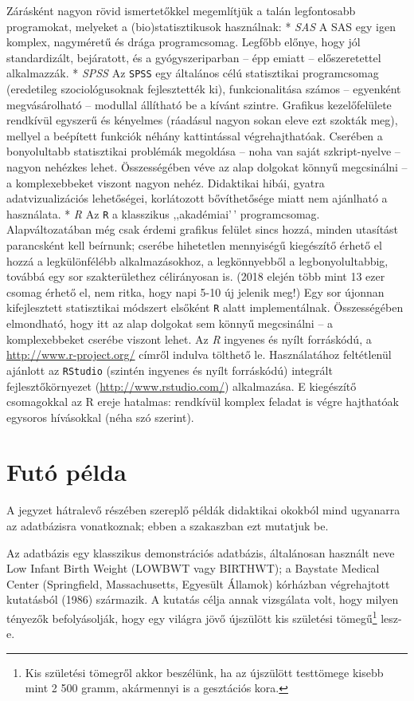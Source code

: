 \documentclass[
]{book}
\begin{document}
Zárásként nagyon rövid ismertetőkkel megemlítjük a talán legfontosabb programokat, melyeket a (bio)statisztikusok használnak:
* \emph{SAS} A SAS egy igen komplex, nagyméretű és drága programcsomag. Legfőbb előnye, hogy jól standardizált, bejáratott, és a gyógyszeriparban -- épp emiatt -- előszeretettel alkalmazzák.
* \emph{SPSS} Az \texttt{SPSS} egy általános célú statisztikai programcsomag (eredetileg szociológusoknak fejlesztették ki), funkcionalitása számos -- egyenként megvásárolható -- modullal állítható be a kívánt szintre. Grafikus kezelőfelülete rendkívül egyszerű és kényelmes (ráadásul nagyon sokan eleve ezt szokták meg), mellyel a beépített funkciók néhány kattintással végrehajthatóak. Cserében a bonyolultabb statisztikai problémák megoldása -- noha van saját szkript-nyelve -- nagyon nehézkes lehet. Összességében véve az alap dolgokat könnyű megcsinálni -- a komplexebbeket viszont nagyon nehéz. Didaktikai hibái, gyatra adatvizualizációs lehetőségei, korlátozott bővíthetősége miatt nem ajánlható a használata.
* \emph{R} Az \texttt{R} a klasszikus ,,akadémiai'\,' programcsomag. Alapváltozatában még csak érdemi grafikus felület sincs hozzá, minden utasítást parancsként kell beírnunk; cserébe hihetetlen mennyiségű kiegészítő érhető el hozzá a legkülönfélébb alkalmazásokhoz, a legkönnyebből a legbonyolultabbig, továbbá egy sor szakterülethez célirányosan is. (2018 elején több mint 13 ezer csomag érhető el, nem ritka, hogy napi 5-10 új jelenik meg!) Egy sor újonnan kifejlesztett statisztikai módszert elsőként \texttt{R} alatt implementálnak. Összességében elmondható, hogy itt az alap dolgokat sem könnyű megcsinálni -- a komplexebbeket cserébe viszont lehet. Az \emph{R} ingyenes és nyílt forráskódú, a \url{http://www.r-project.org/} címről indulva tölthető le. Használatához feltétlenül ajánlott az \texttt{RStudio} (szintén ingyenes és nyílt forráskódú) integrált fejlesztőkörnyezet (\url{http://www.rstudio.com/}) alkalmazása. E kiegészítő csomagokkal az R ereje hatalmas: rendkívül komplex feladat is végre hajthatóak egysoros hívásokkal (néha szó szerint).

\hypertarget{alapokfutopelda}{%
\section{Futó példa}\label{alapokfutopelda}}

A jegyzet hátralevő részében szereplő példák didaktikai okokból mind ugyanarra az adatbázisra vonatkoznak; ebben a szakaszban ezt mutatjuk be.

Az adatbázis egy klasszikus demonstrációs adatbázis, általánosan használt neve Low Infant Birth Weight (LOWBWT vagy BIRTHWT); a Baystate Medical Center (Springfield, Massachusetts, Egyesült Államok) kórházban végrehajtott kutatásból (1986) származik. A kutatás célja annak vizsgálata volt, hogy milyen tényezők befolyásolják, hogy egy világra jövő újszülött kis születési tömegű\footnote{Kis születési tömegről akkor beszélünk, ha az újszülött testtömege kisebb mint 2 500 gramm, akármennyi is a gesztációs kora.} lesz-e.
\end{document}

